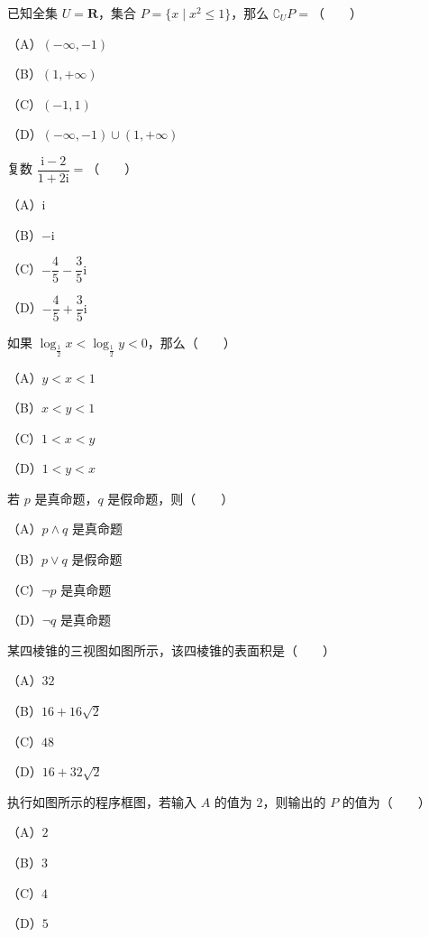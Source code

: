 \begin{question}
已知全集 $U=\mathbf R$，集合 $P=\{x\mid x^2\leqslant 1\}$，那么 $\complement_U P=$\mbox{（　　）}

（A）$(-\infty,-1)$

（B）$(1,+\infty)$

（C）$(-1,1)$

（D）$(-\infty,-1)\cup(1,+\infty)$

\end{question}
\begin{question}
复数 $\dfrac{\mathrm{i}-2}{1+2\mathrm{i}}=$\mbox{（　　）}

（A）$\mathrm{i}$

（B）$-\mathrm{i}$

（C）$-\dfrac45-\dfrac35\mathrm{i}$

（D）$-\dfrac45+\dfrac35\mathrm{i}$

\end{question}
\begin{question}
如果 $\log_{\frac12}x<\log_{\frac12}y<0$，那么\mbox{（　　）}

（A）$y<x<1$

（B）$x<y<1$

（C）$1<x<y$

（D）$1<y<x$

\end{question}
\begin{question}
若 $p$ 是真命题，$q$ 是假命题，则\mbox{（　　）}

（A）$p\wedge q$ 是真命题

（B）$p\vee q$ 是假命题

（C）$\neg p$ 是真命题

（D）$\neg q$ 是真命题

\Needspace{0.4\textheight}
\end{question}
\begin{question}
某四棱锥的三视图如图所示，该四棱锥的表面积是\mbox{（　　）}

（A）$32$

（B）$16+16\sqrt2$

（C）$48$

（D）$16+32\sqrt2$
\nopagebreak[4]
\begin{center}\end{center}
\nopagebreak[4]
\Needspace{0.4\textheight}
\end{question}
\begin{question}
执行如图所示的程序框图，若输入 $A$ 的值为 $2$，则输出的 $P$ 的值为\mbox{（　　）}

（A）$2$

（B）$3$

（C）$4$

（D）$5$
\nopagebreak[4]
\begin{center}\end{center}
\nopagebreak[4]
\end{question}
